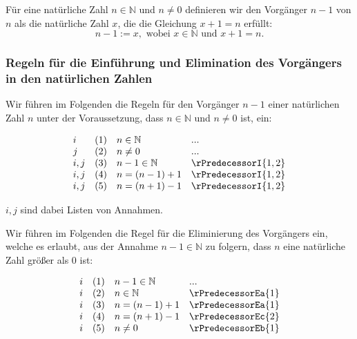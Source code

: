 \documentclass[main.tex]{subfiles}
\begin{document}
\label{def:predecessor}
\begin{definition}
Für eine natürliche Zahl \( n \in \mathbb{N} \) und \( n \neq 0 \) definieren wir den Vorgänger \( n-1 \) von \( n \) als die natürliche Zahl \( x \), die die Gleichung \( x + 1 = n \) erfüllt:
\[
n-1 := x, \text{ wobei } x \in \mathbb{N} \text{ und } x + 1 = n.
\]
\end{definition}

\subsubsection{Regeln für die Einführung und Elimination des Vorgängers in den  natürlichen Zahlen}
\label{rule:rPredecessorI} \label{rule:rPredecessorEa} \label{rule:rPredecessorEb} \label{rule:rPredecessorEc}

Wir führen im Folgenden die Regeln für den Vorgänger \(n-1\) einer natürlichen Zahl \(n\) unter der Voraussetzung, dass \(n \in \mathbb{N}\) und \(n \neq 0\) ist, ein:

\[
\begin{array}{llll}
	i & (1) & n \in \mathbb{N} & ... \\
	j & (2) & n \neq 0 & ... \\
	i,j & (3) & n-1 \in \mathbb{N} & \rPredecessorI{1, 2} \\
        i,j & (4) & n = (n-1)+1 & \rPredecessorI{1,2} \\
        i,j & (5) & n = (n+1)-1 & \rPredecessorI{1,2} \\
\end{array}
\]

\(i, j\) sind dabei Listen von Annahmen.

Wir führen im Folgenden die Regel für die Eliminierung des Vorgängers ein, welche es erlaubt, aus der Annahme \(n-1\in\mathbb{N}\) zu folgern, dass \(n\) eine natürliche Zahl größer als \(0\) ist:

\[
\begin{array}{llll}
	i & (1) & n-1 \in \mathbb{N} & ... \\
	i & (2) & n \in \mathbb{N} & \rPredecessorEa{1} \\
    i & (3) & n = (n-1)+1 & \rPredecessorEa{1} \\
    i & (4) & n = (n+1)-1 & \rPredecessorEc{2} \\
	i & (5) & n \neq 0 & \rPredecessorEb{1} \\
\end{array}
\]
\end{document}

